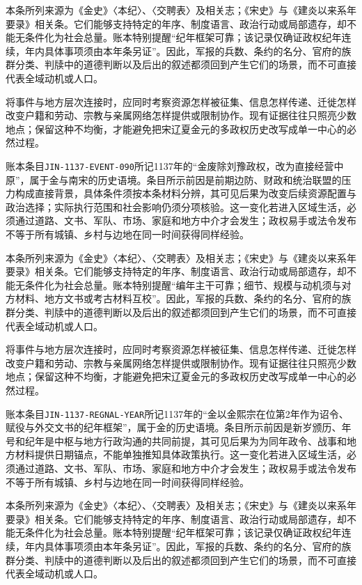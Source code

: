 本条所列来源为《金史》〈本纪〉、〈交聘表〉及相关志；《宋史》与《建炎以来系年要录》相关条。它们能够支持特定的年序、制度语言、政治行动或局部遗存，却不能无条件化为社会总量。账本特别提醒“纪年框架可靠；该记录仅确证政权纪年连续，年内具体事项须由本年条另证”。因此，军报的兵数、条约的名分、官府的族群分类、判牍中的道德判断以及后出的叙述都须回到产生它们的场景，而不可直接代表全域动机或人口。

将事件与地方层次连接时，应同时考察资源怎样被征集、信息怎样传递、迁徙怎样改变户籍和劳动、宗教与亲属网络怎样提供或限制协作。现有证据往往只照亮少数地点；保留这种不均衡，才能避免把宋辽夏金元的多政权历史改写成单一中心的必然过程。

账本条目\texttt{JIN-1137-EVENT-090}所记1137年的“金废除刘豫政权，改为直接经营中原”，属于金与南宋的历史语境。条目所示前因是前期边防、财政和统治联盟的压力构成直接背景，具体条件须按本条材料分辨，其可见后果为改变后续资源配置与政治选择；实际执行范围和社会影响仍须分项核验。这一变化若进入区域生活，必须通过道路、文书、军队、市场、家庭和地方中介才会发生；政权易手或法令发布不等于所有城镇、乡村与边地在同一时间获得同样经验。

本条所列来源为《金史》〈本纪〉、〈交聘表〉及相关志；《宋史》与《建炎以来系年要录》相关条。它们能够支持特定的年序、制度语言、政治行动或局部遗存，却不能无条件化为社会总量。账本特别提醒“编年主干可靠；细节、规模与动机须与对方材料、地方文书或考古材料互校”。因此，军报的兵数、条约的名分、官府的族群分类、判牍中的道德判断以及后出的叙述都须回到产生它们的场景，而不可直接代表全域动机或人口。

将事件与地方层次连接时，应同时考察资源怎样被征集、信息怎样传递、迁徙怎样改变户籍和劳动、宗教与亲属网络怎样提供或限制协作。现有证据往往只照亮少数地点；保留这种不均衡，才能避免把宋辽夏金元的多政权历史改写成单一中心的必然过程。

账本条目\texttt{JIN-1137-REGNAL-YEAR}所记1137年的“金以金熙宗在位第2年作为诏令、赋役与外交文书的纪年框架”，属于金的历史语境。条目所示前因是新岁颁历、年号和纪年是中枢与地方行政沟通的共同前提，其可见后果为为同年政令、战事和地方材料提供日期锚点，不能单独推知具体政策执行。这一变化若进入区域生活，必须通过道路、文书、军队、市场、家庭和地方中介才会发生；政权易手或法令发布不等于所有城镇、乡村与边地在同一时间获得同样经验。

本条所列来源为《金史》〈本纪〉、〈交聘表〉及相关志；《宋史》与《建炎以来系年要录》相关条。它们能够支持特定的年序、制度语言、政治行动或局部遗存，却不能无条件化为社会总量。账本特别提醒“纪年框架可靠；该记录仅确证政权纪年连续，年内具体事项须由本年条另证”。因此，军报的兵数、条约的名分、官府的族群分类、判牍中的道德判断以及后出的叙述都须回到产生它们的场景，而不可直接代表全域动机或人口。

